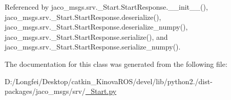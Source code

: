 Referenced by jaco\+\_\+msgs.\+srv.\+\_\+\+Start.\+Start\+Response.\+\_\+\+\_\+init\+\_\+\+\_\+(), jaco\+\_\+msgs.\+srv.\+\_\+\+Start.\+Start\+Response.\+deserialize(), jaco\+\_\+msgs.\+srv.\+\_\+\+Start.\+Start\+Response.\+deserialize\+\_\+numpy(), jaco\+\_\+msgs.\+srv.\+\_\+\+Start.\+Start\+Response.\+serialize(), and jaco\+\_\+msgs.\+srv.\+\_\+\+Start.\+Start\+Response.\+serialize\+\_\+numpy().



The documentation for this class was generated from the following file\+:\begin{DoxyCompactItemize}
\item 
D\+:/\+Longfei/\+Desktop/catkin\+\_\+\+Kinova\+R\+O\+S/devel/lib/python2./dist-\/packages/jaco\+\_\+msgs/srv/\hyperlink{__Start_8py}{\+\_\+\+Start.\+py}\end{DoxyCompactItemize}
